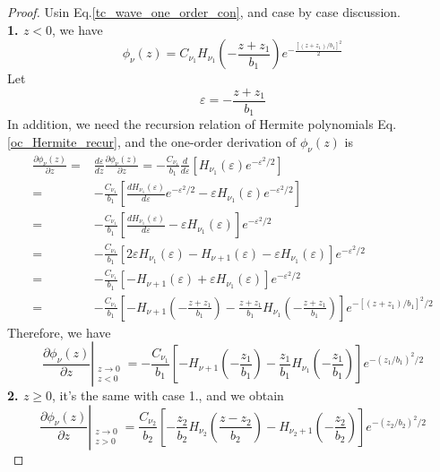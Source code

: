   \begin{proof}
    Usin Eq.\eqref{tc_wave_one_order_con}, and case by case discussion.\\
    \textbf{1. $z < 0$}, we have
    \begin{equation}
      \phi_{\nu}(z) = C_{\nu_1} H_{\nu_1}(-\frac{z+z_1}{b_1}) e^{-\frac{[(z+z_1)/b_1]^2}{2}}
    \end{equation}
    Let
    \begin{equation}
        \varepsilon = -\frac{z+z_1}{b_1}
    \end{equation}
    In addition, we need the recursion relation of Hermite polynomials Eq.\eqref{oc_Hermite_recur}, and the one-order derivation of $\phi_{\nu}(z)$ is
    \begin{equation}
      \begin{aligned}
        \frac{\partial \phi_{\nu}(z)}{\partial z} =& \frac{d\varepsilon}{d z} \frac{\partial \phi_{\nu}(z)}{\partial z} = -\frac{C_{\nu_1}}{b_1} \frac{d}{d\varepsilon} \left[ H_{\nu_1}(\varepsilon) e^{-\varepsilon^2/2} \right]  \\
        =& -\frac{C_{\nu_1}}{b_1} \left[ \frac{d H_{\nu_1}(\varepsilon)}{d\varepsilon}  e^{-\varepsilon^2/2} - \varepsilon H_{\nu_1}(\varepsilon)  e^{-\varepsilon^2/2}\right]  \\
        =& -\frac{C_{\nu_1}}{b_1} \left[ \frac{d H_{\nu_1}(\varepsilon)}{d\varepsilon} - \varepsilon H_{\nu_1}(\varepsilon)\right]  e^{-\varepsilon^2/2}  \\
        =& -\frac{C_{\nu_1}}{b_1} \left[ 2\varepsilon H_{\nu_1}(\varepsilon) - H_{\nu+1}(\varepsilon) - \varepsilon H_{\nu_1}(\varepsilon)\right]  e^{-\varepsilon^2/2}  \\
        =& -\frac{C_{\nu_1}}{b_1} \left[ - H_{\nu+1}(\varepsilon) + \varepsilon H_{\nu_1}(\varepsilon)\right]  e^{-\varepsilon^2/2}  \\
        =& -\frac{C_{\nu_1}}{b_1} \left[ - H_{\nu+1}(-\frac{z+z_1}{b_1}) - \frac{z+z_1}{b_1} H_{\nu_1}(-\frac{z+z_1}{b_1})\right]  e^{-[(z+z_1)/b_1]^2/2}  \label{tc_phi_z_first_der}
      \end{aligned}
    \end{equation}
    Therefore, we have
    \begin{equation}
      \frac{\partial\phi_\nu(z)}{\partial z} \left|_{\substack{z \rightarrow 0 \\ z< 0}} \right. 
      = -\frac{C_{\nu_1}}{b_1} \left[ - H_{\nu+1}(-\frac{z_1}{b_1}) - \frac{z_1}{b_1} H_{\nu_1}(-\frac{z_1}{b_1})\right]  e^{-(z_1/b_1)^2/2} \label{tc_wave_one_order_l}
    \end{equation}
    \textbf{2. $z \geq 0$}, it's the same with case 1., and we obtain
    \begin{equation}
      \frac{\partial\phi_\nu(z)}{\partial z} \left|_{\substack{z \rightarrow 0 \\ z > 0}} \right. 
      = \frac{C_{\nu_2}}{b_2} \left[ -\frac{z_2}{b_2} H_{\nu_2}(\frac{z - z_2}{b_2}) - H_{\nu_2 + 1}(-\frac{z_2}{b_2}) \right] e^{-(z_2/b_2)^2/2} \label{tc_wave_one_order_r}
    \end{equation}


\end{proof}
